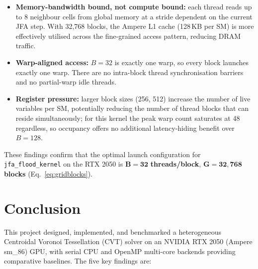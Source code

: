 \documentclass[12pt,a4paper]{article}
\begin{document}
\begin{itemize}
    \item \textbf{Memory-bandwidth bound, not compute bound:} each thread reads
          up to 8 neighbour cells from global memory at a stride dependent on the
          current JFA step.  With 32{,}768 blocks, the Ampere L1 cache (128\,KB
          per SM) is more effectively utilised across the fine-grained access
          pattern, reducing DRAM traffic.

    \item \textbf{Warp-aligned access:} $B = 32$ is exactly one warp, so every
          block launches exactly one warp.  There are no intra-block thread
          synchronisation barriers and no partial-warp idle threads.

    \item \textbf{Register pressure:} larger block sizes (256, 512) increase the
          number of live variables per SM, potentially reducing the number of
          thread blocks that can reside simultaneously; for this kernel the peak
          warp count saturates at 48 regardless, so occupancy offers no
          additional latency-hiding benefit over $B = 128$.
\end{itemize}

These findings confirm that the optimal launch configuration for
\texttt{jfa\_flood\_kernel} on the RTX 2050 is
$\mathbf{B = 32}$ \textbf{threads/block},
$\mathbf{G = 32{,}768}$ \textbf{blocks} (Eq.~\eqref{eq:gridblocks}).

\newpage
\section{Conclusion}

This project designed, implemented, and benchmarked a heterogeneous
Centroidal Voronoi Tessellation (CVT) solver on an NVIDIA RTX 2050
(Ampere sm\_86) GPU, with serial CPU and OpenMP multi-core backends
providing comparative baselines.  The five key findings are:
\end{document}
